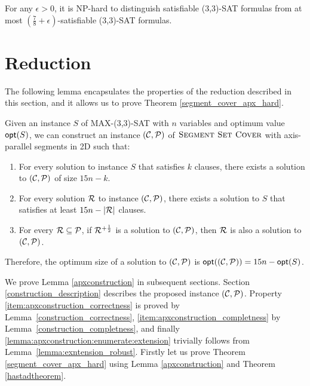\begin{tw}{
	\label{hastadtheorem}
	For any $\epsilon > 0$, it is NP-hard to distinguish satisfiable
	\linebreak
	(3,3)-SAT formulas from
	at most
	\mbox{$(\frac{7}{8} + \epsilon)$-satisfiable}
	(3,3)-SAT formulas.
}\end{tw}

\section{Reduction}

The following lemma encapsulates the properties
of the reduction described in this section,
and it allows us to prove Theorem \ref{segment_cover_apx_hard}.

\begin{lemma}{
	\label{apxconstruction}
	Given an instance $S$ of MAX-(3,3)-SAT 
	with $n$ variables and optimum value $\mathsf{opt}(S)$,
	we can construct an instance $(\mathcal{C}, \mathcal{P})$ of $\textsc{Segment Set Cover}$ with
	axis-parallel segments in 2D such that:
	\begin{enumerate}[label={(\arabic*)}]
	\item \label{item:apxconstruction_correctness}
	For every solution to instance $S$ that satisfies $k$ clauses,
	there exists a solution to $(\mathcal{C}, \mathcal{P})$ of size $15n - k$.
	
	\item \label{item:apxconstruction_completness}
	For every solution $\mathcal{R}$ to instance $(\mathcal{C}, \mathcal{P})$,
	there exists a solution to $S$ that satisfies at least  $15n - |\mathcal{R}|$
	clauses.
	
	\item \label{lemma:apxconstruction:enumerate:extension}
	For every $\mathcal{R} \subseteq \mathcal{P}$, if $\mathcal{R}^{+\frac{1}{2}}$
	is a solution to $(\mathcal{C}, \mathcal{P})$, then $\mathcal{R}$
	is also a solution to $(\mathcal{C}, \mathcal{P})$.
\end{enumerate}
Therefore, the optimum size of a solution to $(\mathcal{C}, \mathcal{P})$
is $\mathsf{opt}((\mathcal{C}, \mathcal{P})) = 15n - \mathsf{opt}(S)$. 
	
}\end{lemma}

We prove Lemma \ref{apxconstruction} in
subsequent sections. Section \ref{construction_description}
describes the proposed instance $(\mathcal{C}, \mathcal{P})$.
Property \ref{item:apxconstruction_correctness} is proved by Lemma~\ref{construction_correctness},
\ref{item:apxconstruction_completness} by Lemma~\ref{construction_completness},
and finally \ref{lemma:apxconstruction:enumerate:extension} trivially
follows from Lemma~\ref{lemma:exntension_robust}.
Firstly let us prove
Theorem \ref{segment_cover_apx_hard} using Lemma \ref{apxconstruction}
and Theorem \ref{hastadtheorem}.

